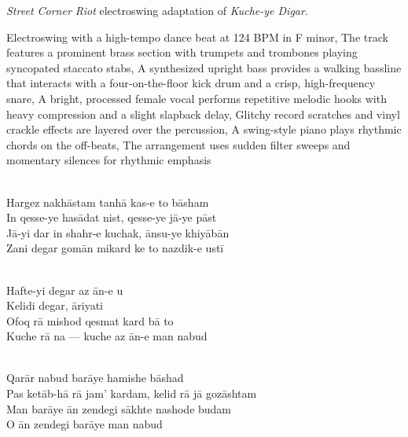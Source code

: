 
\begin{notes}
\emph{Street Corner Riot} electroswing adaptation of \emph{Kuche-ye Digar}.
\end{notes}
\begin{style}
Electroswing with a high-tempo dance beat at 124 BPM in F minor, The track features a prominent brass section with trumpets and trombones playing syncopated staccato stabs, A synthesized upright bass provides a walking bassline that interacts with a four-on-the-floor kick drum and a crisp, high-frequency snare, A bright, processed female vocal performs repetitive melodic hooks with heavy compression and a slight slapback delay, Glitchy record scratches and vinyl crackle effects are layered over the percussion, A swing-style piano plays rhythmic chords on the off-beats, The arrangement uses sudden filter sweeps and momentary silences for rhythmic emphasis
\end{style}
\begin{lyrics}
\\
Hargez nakhāstam tanhā kas-e to bāsham
\\
In qesse-ye hasādat nist, qesse-ye jā-ye pāst
\\
Jā-yi dar in shahr-e kuchak, ānsu-ye khiyābān\\
Zani degar gomān mikard ke to nazdik-e ustī

\\
Hafte-yi degar az ān-e u\\
Kelidi degar, āriyati\\
Ofoq rā mishod qesmat kard bā to\\
Kuche rā na — kuche az ān-e man nabud

\\
Qarār nabud barāye hamishe bāshad\\
Pas ketāb-hā rā jam' kardam, kelid rā jā gozāshtam\\
Man barāye ān zendegi sākhte nashode budam\\
O ān zendegi barāye man nabud
\end{lyrics}


